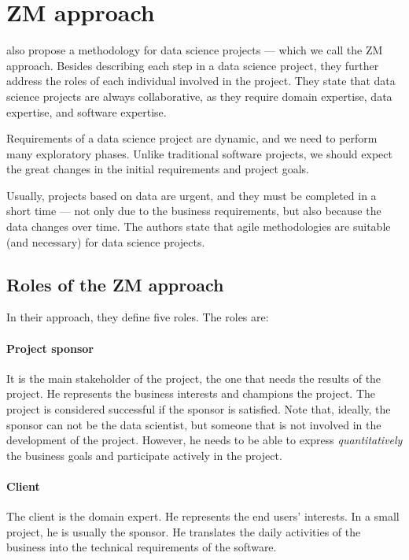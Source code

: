 \section{ZM approach}

\textcite{Zumel2019} also propose a methodology for data science projects --- which we
call the ZM approach.  Besides
describing each step in a data science project, they further address the roles of each
individual involved in the project.  They state that data science projects are always
collaborative, as they require domain expertise, data expertise, and software expertise.

Requirements of a data science project are dynamic, and we need to perform many
exploratory phases.  Unlike traditional software projects, we should expect the
great changes in the initial requirements and project goals.

Usually,
projects based on data are urgent, and they must be completed in a short time --- not
only due to the business requirements, but also because the data changes over time.
The authors state that agile methodologies are suitable (and necessary) for data science
projects.

\subsection{Roles of the ZM approach}

In their approach, they define five roles.  The roles are:

\paragraph{Project sponsor}  It is the main stakeholder of the project, the one that needs the
results of the project.  He represents the business interests and champions the project.
The project is considered successful if the sponsor is satisfied.  Note that, ideally, the
sponsor can not be the data scientist, but someone that is not involved in the development
of the project.  However, he needs to be able to express \emph{quantitatively} the business
goals and participate actively in the project.

\paragraph{Client}  The client is the domain expert.  He represents the end users'
interests.  In a small project, he is usually the sponsor.  He translates the daily
activities of the business into the technical requirements of the software.

